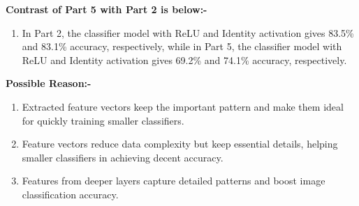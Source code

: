 \documentclass{article}
\begin{document}
\textbf{Contrast of Part 5 with Part 2 is below:-}
\begin{enumerate}
\item In Part 2, the classifier model with ReLU and Identity activation gives 83.5\% and 83.1\% accuracy, respectively, while in Part 5, the classifier model with ReLU and Identity activation gives 69.2\% and 74.1\% accuracy, respectively.
\end{enumerate}

\hspace{-20pt}
\textbf{Possible Reason:-}
\begin{enumerate}
\item Extracted feature vectors keep the important pattern and make them ideal for quickly training smaller classifiers.
\item Feature vectors reduce data complexity but keep essential details, helping smaller classifiers in achieving decent accuracy.
\item Features from deeper layers capture detailed patterns and boost image classification accuracy.
\end{enumerate}

\end{document}
